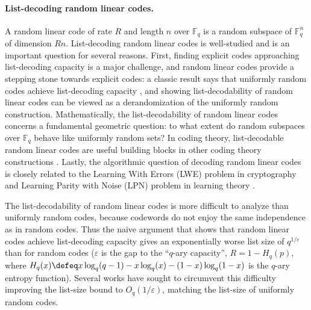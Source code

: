 \documentclass{article}[11pt]
\begin{document}
\paragraph{List-decoding random linear codes.}
A random linear code of rate $R$ and length $n$ over $\mathbb{F}_q$ is a random subspace of $\mathbb{F}_q^n$ of dimension $Rn$.
List-decoding random linear codes is well-studied \cite{ZP81, Elias91, GHSZ02,GHK11,Wootters13,RudraW14,RudraW18, LiW20,MRRSW20, GLMSSW21, GM22,PP23} and is an important question for several reasons.
First, finding explicit codes approaching list-decoding capacity is a major challenge, and random linear codes provide a stepping stone towards explicit codes: a classic result says that uniformly random codes achieve list-decoding capacity \cite{Elias57,Wozencraft58}, and showing list-decodability of random linear codes can be viewed as a derandomization of the uniformly random construction.
Mathematically, the list-decodability of random linear codes concerns a fundamental geometric question: to what extent do random subspaces over $\mathbb{F}_q$ behave like uniformly random sets?
In coding theory, list-decodable random linear codes are useful building blocks in other coding theory constructions \cite{GI01, HW18}.
Lastly, the algorithmic question of decoding random linear codes is closely related to the Learning With Errors (LWE) problem in cryptography \cite{Regev09} and Learning Parity with Noise (LPN) problem in learning theory \cite{BKW03,FGKP06}.


The list-decodability of random linear codes is more difficult to analyze than uniformly random codes, because codewords do not enjoy the same independence as in random codes. Thus the naive argument that shows that random linear codes achieve list-decoding capacity \cite{ZP81} gives an exponentially worse list size of $q^{1/\varepsilon}$ than for random codes ($\varepsilon$ is the gap to the ``$q$-ary capacity'', $R=1-H_q(p)$,  where $H_q(x)\defeq x\log_q(q-1) - x\log_q(x)-(1-x)\log_q(1-x)$ is the $q$-ary entropy function). 
Several works have sought to circumvent this difficulty \cite{Elias91, GHSZ02, GHK11, Wootters13, RudraW14, RudraW18, LiW20, GLMSSW21} improving the list-size bound to $O_q(1/\varepsilon)$, matching the list-size of uniformly random codes.
\end{document}
